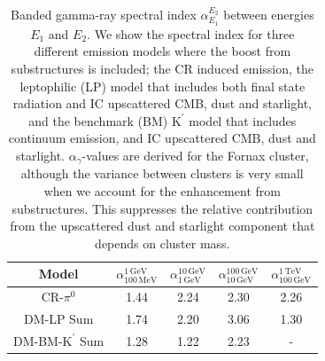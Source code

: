 \documentclass[10pt,aps,pra,reprint,amsmath,amsfonts,amssymb,showpacs,nofootinbib,floatfix]{revtex4-1}
\newcommand{\rmn}{\mathrm}
\newcommand{\Kp}{\rmn{K}^\prime}
\begin{document}
\begin{table}
\begin{tabular}{ccccc}
\hline\hline
      Model & $\alpha_{100\,\rmn{MeV}}^{1\,\rmn{GeV}}$ &
              $\alpha_{1\,\rmn{GeV}}^{10\,\rmn{GeV}}$ &
              $\alpha_{10\,\rmn{GeV}}^{100\,\rmn{GeV}}$ &
              $\alpha_{100\,\rmn{GeV}}^{1\,\rmn{TeV}}$ \\
\hline
CR-$\pi^0$ & 1.44 & 2.24 & 2.30 & 2.26 \\
DM-LP Sum & 1.74 & 2.20 & 3.06 & 1.30 \\
DM-BM-$\Kp$ Sum & 1.28 & 1.22 & 2.23 & - \\
\hline\hline
\end{tabular}
\caption{Banded gamma-ray spectral index $\alpha_{E_1}^{E_2}$ between
  energies $E_1$ and $E_2$. We show the spectral index for three
  different emission models where the boost from substructures is
  included; the CR induced emission, the leptophilic (LP) model that
  includes both final state radiation and IC upscattered CMB, dust and
  starlight, and the benchmark (BM) $\Kp$ model that includes
  continuum emission, and IC upscattered CMB, dust and
  starlight. $\alpha_\gamma$-values are derived for the Fornax
  cluster, although the variance between clusters is very small when
  we account for the enhancement from substructures. This suppresses
  the relative contribution from the upscattered dust and starlight
  component that depends on cluster mass. \label{tab:spectral_index}}
\end{table}
\end{document}
